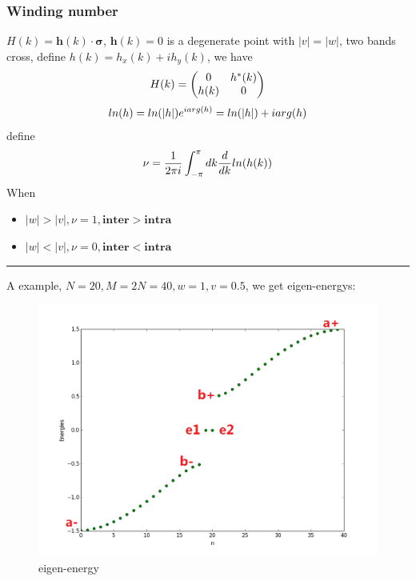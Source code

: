 \documentclass[letterpaper,10pt,english]{sphinxmanual}
\begin{document}
\subsubsection{Winding number}
\label{TI/Lecture notes/1:winding-number}
\(H(k)=\mathbf{h}(k)\cdot \mathbf{\sigma}\), \(\mathbf{h}(k)=0\) is a
degenerate point with \(|v|=|w|\), two bands cross, define
\(h(k)=h_x(k)+ih_y(k)\), we have
\begin{gather}
\begin{split}H(k)=\begin{pmatrix}0&h^*(k)\\h(k)&0\end{pmatrix}\end{split}\notag
\end{gather}\begin{gather}
\begin{split}ln(h)=ln(|h|)e^{iarg(h)}=ln(|h|)+iarg(h)\end{split}\notag
\end{gather}
define
\begin{gather}
\begin{split}\nu=\frac{1}{2\pi i}\int_{-\pi}^{\pi}dk\frac{d}{dk}ln(h(k))\end{split}\notag
\end{gather}
When
\begin{itemize}
\item {} 
\(|w|>|v|, \nu=1, \mathbf{inter}>\mathbf{intra}\)

\item {} 
\(|w|<|v|, \nu=0, \mathbf{inter}<\mathbf{intra}\)

\end{itemize}


\bigskip\hrule{}\bigskip


A example, \(N=20, M=2N=40, w=1, v=0.5\), we get eigen-energys:
\begin{figure}[htbp]
\centering
\capstart

\includegraphics[width=0.700\linewidth]{4.png}
\caption{eigen-energy}\end{figure}
\end{document}
